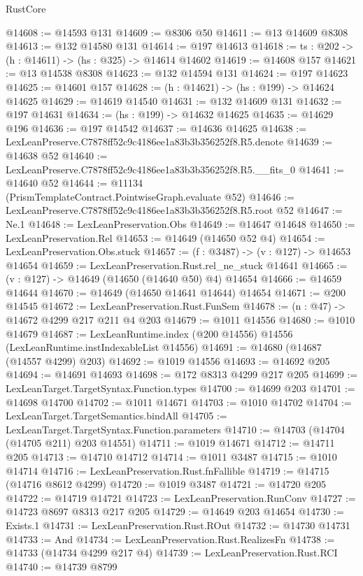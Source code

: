 \begin{lexlean}{RustCore}
\begin{coremodule}
@14608 := @14593 @131
@14609 := @8306 @50
@14611 := @13 @14609 @8308
@14613 := @132 @14580 @131
@14614 := @197 @14613
@14618 := {ts : @202} -> (h : @14611) -> (hs : @325) -> @14614 @14602
@14619 := @14608 @157
@14621 := @13 @14538 @8308
@14623 := @132 @14594 @131
@14624 := @197 @14623
@14625 := @14601 @157
@14628 := (h : @14621) -> (hs : @199) -> @14624 @14625
@14629 := @14619 @14540
@14631 := @132 @14609 @131
@14632 := @197 @14631
@14634 := (hs : @199) -> @14632 @14625
@14635 := @14629 @196
@14636 := @197 @14542
@14637 := @14636 @14625
@14638 := LexLeanPreserve.C7878ff52c9c4186ee1a83b3b356252f8.R5.denote
@14639 := @14638 @52
@14640 := LexLeanPreserve.C7878ff52c9c4186ee1a83b3b356252f8.R5.__fits_0
@14641 := @14640 @52
@14644 := @11134 (PrismTemplateContract.PointwiseGraph.evaluate @52)
@14646 := LexLeanPreserve.C7878ff52c9c4186ee1a83b3b356252f8.R5.root @52
@14647 := Ne.{1}
@14648 := LexLeanPreservation.Obs
@14649 := @14647 @14648
@14650 := LexLeanPreservation.Rel
@14653 := @14649 (@14650 @52 @4)
@14654 := LexLeanPreservation.Obs.stuck
@14657 := (f : @3487) -> (v : @127) -> @14653 @14654
@14659 := LexLeanPreservation.Rust.rel_ne_stuck @14641
@14665 := (v : @127) -> @14649 (@14650 (@14640 @50) @4) @14654
@14666 := @14659 @14644
@14670 := @14649 (@14650 @14641 @14644) @14654
@14671 := @200 @14545
@14672 := LexLeanPreservation.Rust.FunSem
@14678 := (n : @47) -> @14672 @4299 @217 @211 @4 @203
@14679 := @1011 @14556
@14680 := @1010 @14679
@14687 := LexLeanRuntime.index (@200 @14556) @14556 (LexLeanRuntime.instIndexableList @14556)
@14691 := @14680 (@14687 (@14557 @4299) @203)
@14692 := @1019 @14556
@14693 := @14692 @205
@14694 := @14691 @14693
@14698 := @172 @8313 @4299 @217 @205
@14699 := LexLeanTarget.TargetSyntax.Function.types
@14700 := @14699 @203
@14701 := @14698 @14700
@14702 := @1011 @14671
@14703 := @1010 @14702
@14704 := LexLeanTarget.TargetSemantics.bindAll
@14705 := LexLeanTarget.TargetSyntax.Function.parameters
@14710 := @14703 (@14704 (@14705 @211) @203 @14551)
@14711 := @1019 @14671
@14712 := @14711 @205
@14713 := @14710 @14712
@14714 := @1011 @3487
@14715 := @1010 @14714
@14716 := LexLeanPreservation.Rust.fnFallible
@14719 := @14715 (@14716 @8612 @4299)
@14720 := @1019 @3487
@14721 := @14720 @205
@14722 := @14719 @14721
@14723 := LexLeanPreservation.RunConv
@14727 := @14723 @8697 @8313 @217 @205
@14729 := @14649 @203 @14654
@14730 := Exists.{1}
@14731 := LexLeanPreservation.Rust.ROut
@14732 := @14730 @14731
@14733 := And
@14734 := LexLeanPreservation.Rust.RealizesFn
@14738 := @14733 (@14734 @4299 @217 @4)
@14739 := LexLeanPreservation.Rust.RCI
@14740 := @14739 @8799

\end{coremodule}
\end{lexlean}
